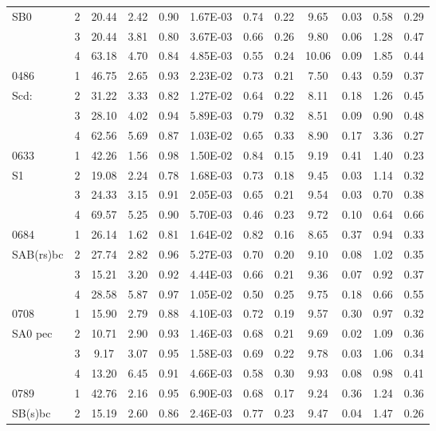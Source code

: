 \begin{center}
\begin{longtable}{lccccccccccc}
SB0	&	2	&	20.44	&	2.42	&	0.90	&	1.67E-03	&	0.74	&	0.22	&	9.65	&	0.03	&	0.58	&	0.29	\\
	&	3	&	20.44	&	3.81	&	0.80	&	3.67E-03	&	0.66	&	0.26	&	9.80	&	0.06	&	1.28	&	0.47	\\
	&	4	&	63.18	&	4.70	&	0.84	&	4.85E-03	&	0.55	&	0.24	&	10.06	&	0.09	&	1.85	&	0.44	\\
0486	&	1	&	46.75	&	2.65	&	0.93	&	2.23E-02	&	0.73	&	0.21	&	7.50	&	0.43	&	0.59	&	0.37	\\
Scd:	&	2	&	31.22	&	3.33	&	0.82	&	1.27E-02	&	0.64	&	0.22	&	8.11	&	0.18	&	1.26	&	0.45	\\
	&	3	&	28.10	&	4.02	&	0.94	&	5.89E-03	&	0.79	&	0.32	&	8.51	&	0.09	&	0.90	&	0.48	\\
	&	4	&	62.56	&	5.69	&	0.87	&	1.03E-02	&	0.65	&	0.33	&	8.90	&	0.17	&	3.36	&	0.27	\\
0633	&	1	&	42.26	&	1.56	&	0.98	&	1.50E-02	&	0.84	&	0.15	&	9.19	&	0.41	&	1.40	&	0.23	\\
S1	&	2	&	19.08	&	2.24	&	0.78	&	1.68E-03	&	0.73	&	0.18	&	9.45	&	0.03	&	1.14	&	0.32	\\
	&	3	&	24.33	&	3.15	&	0.91	&	2.05E-03	&	0.65	&	0.21	&	9.54	&	0.03	&	0.70	&	0.38	\\
	&	4	&	69.57	&	5.25	&	0.90	&	5.70E-03	&	0.46	&	0.23	&	9.72	&	0.10	&	0.64	&	0.66	\\
0684	&	1	&	26.14	&	1.62	&	0.81	&	1.64E-02	&	0.82	&	0.16	&	8.65	&	0.37	&	0.94	&	0.33	\\
SAB(rs)bc	&	2	&	27.74	&	2.82	&	0.96	&	5.27E-03	&	0.70	&	0.20	&	9.10	&	0.08	&	1.02	&	0.35	\\
	&	3	&	15.21	&	3.20	&	0.92	&	4.44E-03	&	0.66	&	0.21	&	9.36	&	0.07	&	0.92	&	0.37	\\
	&	4	&	28.58	&	5.87	&	0.97	&	1.05E-02	&	0.50	&	0.25	&	9.75	&	0.18	&	0.66	&	0.55	\\
0708	&	1	&	15.90	&	2.79	&	0.88	&	4.10E-03	&	0.72	&	0.19	&	9.57	&	0.30	&	0.97	&	0.32	\\
SA0 pec	&	2	&	10.71	&	2.90	&	0.93	&	1.46E-03	&	0.68	&	0.21	&	9.69	&	0.02	&	1.09	&	0.36	\\
	&	3	&	9.17	&	3.07	&	0.95	&	1.58E-03	&	0.69	&	0.22	&	9.78	&	0.03	&	1.06	&	0.34	\\
	&	4	&	13.20	&	6.45	&	0.91	&	4.66E-03	&	0.58	&	0.30	&	9.93	&	0.08	&	0.98	&	0.41	\\
0789	&	1	&	42.76	&	2.16	&	0.95	&	6.90E-03	&	0.68	&	0.17	&	9.24	&	0.36	&	1.24	&	0.36	\\
SB(s)bc	&	2	&	15.19	&	2.60	&	0.86	&	2.46E-03	&	0.77	&	0.23	&	9.47	&	0.04	&	1.47	&	0.26	\\

\end{longtable}
\end{center}
